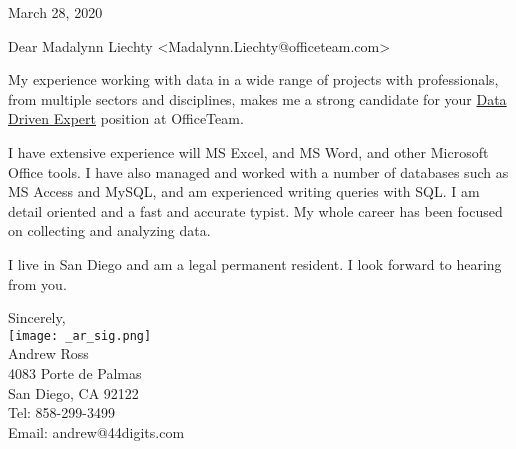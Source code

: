 \documentclass[letterpaper]{article}
\newcommand{\CVjobTitle}{Data Driven Expert}
\newcommand{\CVcompany}{OfficeTeam}
\newcommand{\impt}[1]{\uline{#1}}
\begin{document}
\large

\null\hfill March 28, 2020
\vspace{1em}

Dear Madalynn Liechty <Madalynn.Liechty@officeteam.com>

My experience working with data in a wide range of
projects with professionals, from multiple sectors and disciplines, makes me a
strong candidate for your \impt{\CVjobTitle} position at \CVcompany.

I have extensive experience will MS Excel, and MS Word, and other Microsoft
Office tools.
I have also managed and worked with a number of databases 
such as MS Access and MySQL, and am experienced writing queries with SQL.  
I am detail oriented and a fast and accurate typist.  
My whole career has been focused on collecting and analyzing data.

I live in San Diego and am a legal permanent resident.  
I look forward to hearing from you.  


Sincerely,\\
\hspace{1em} \texttt{[image: \_ar\_sig.png]} \\
Andrew Ross \\
\small
4083 Porte de Palmas \\
San Diego, CA  92122 \\
Tel: 858-299-3499 \\
Email: andrew@44digits.com
\end{document}
